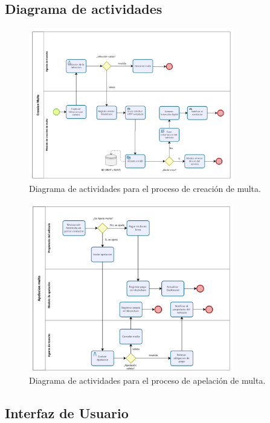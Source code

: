 \documentclass[
    letterpaper, 
    man,   
    spanish,
    12pt,
    donotrepeattitle,
    floatsintext,
    hidelinks %
]{apa7}
\begin{document}
\subsection{ Diagrama de actividades }
 \begin{figure}[htbp]
    \centering
    \includegraphics[width=0.8\textwidth]{Images/ActMulta.png}
    \caption{Diagrama de actividades para el proceso de creación de multa.}
    \label{fig:diagrama_creacion_multa}
\end{figure}
 \begin{figure}[htbp]
    \centering
    \includegraphics[width=0.8\textwidth]{Images/ActApelacion.png}
    \caption{Diagrama de actividades para el proceso de apelación de multa.}
    \label{fig:diagrama_apelacion_2}
\end{figure}

\subsection{Interfaz de Usuario}
\end{document}
